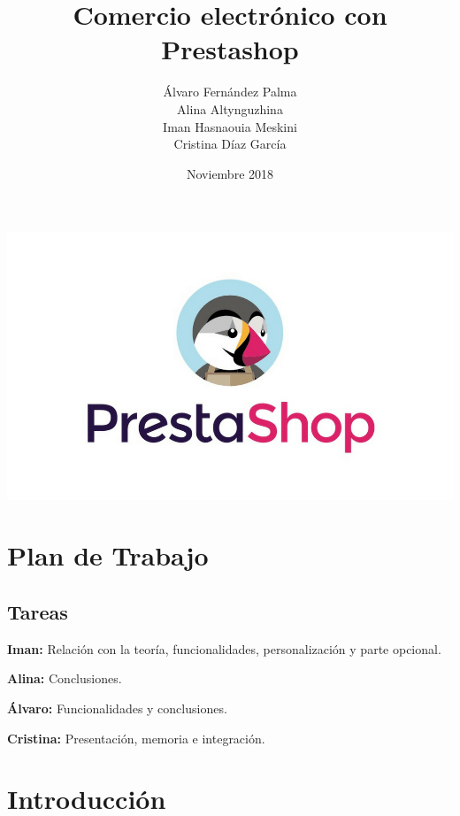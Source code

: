 \documentclass{article}
\title{Comercio electrónico con Prestashop}
\author{Álvaro Fernández Palma\\ Alina Altynguzhina\\ Iman Hasnaouia Meskini\\ Cristina Díaz García}
\date{Noviembre 2018}
\begin{document}

\begin{titlingpage}
\maketitle

\begin{flushleft}
\includegraphics[scale=0.4]{images/prestashop.png} 
\end{flushleft}

\end{titlingpage}

\newpage

\tableofcontents

\newpage

\section{Plan de Trabajo}

\subsection{Tareas} 

\textbf{Iman:} Relación con la teoría, funcionalidades, personalización y parte opcional. 

\textbf{Alina:} Conclusiones. 

\textbf{Álvaro:} Funcionalidades y conclusiones. 

\textbf{Cristina:} Presentación, memoria e integración. 


\section{Introducción}
\end{document}

